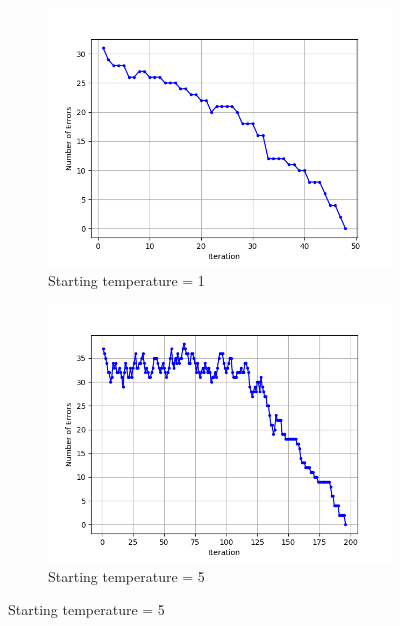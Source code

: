 \documentclass[11pt]{article}
\begin{document}
\begin{figure}[ht]
\centering
\begin{subfigure}{0.48\textwidth}
\centering
\includegraphics[width=\textwidth]{images/Figure_3.png}
\caption{Starting temperature = 1}
\label{fig:batch_startT_1}
\end{subfigure}
\hfill
\begin{subfigure}{0.48\textwidth}
\centering
\includegraphics[width=\textwidth]{images/Figure_4.png}
\caption{Starting temperature = 5}
\label{fig:batch_startT_5}
\end{subfigure}

\vspace{1em}


\end{figure}
\end{document}
